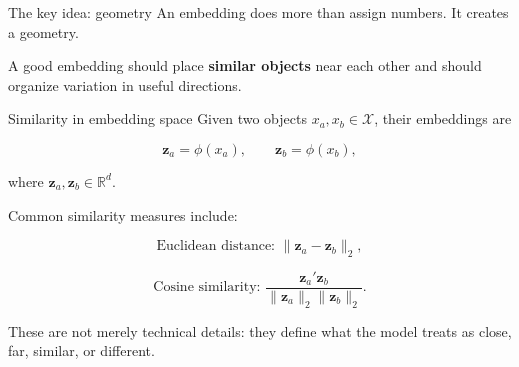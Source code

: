 \documentclass[aspectratio=169]{beamer}
\newcommand{\R}{\mathbb{R}}
\newcommand{\vect}[1]{\boldsymbol{#1}}
\begin{document}
\begin{frame}{The key idea: geometry}
\large
An embedding does more than assign numbers. It creates a geometry.

\vspace{0.3cm}

\begin{center}
\end{center}

\vspace{0.3cm}

A good embedding should place \textbf{similar objects} near each other and should organize variation in useful directions.
\end{frame}

\begin{frame}{Similarity in embedding space}
\large
Given two objects \(x_a,x_b \in \mathcal{X}\), their embeddings are

\[
\vect{z}_a = \phi(x_a), \qquad \vect{z}_b = \phi(x_b),
\]

where \(\vect{z}_a,\vect{z}_b \in \R^d\).

\vspace{0.3cm}

Common similarity measures include:

\[
\text{Euclidean distance: } \|\vect{z}_a-\vect{z}_b\|_2,
\]

\[
\text{Cosine similarity: }
\frac{\vect{z}_a'\vect{z}_b}{\|\vect{z}_a\|_2\|\vect{z}_b\|_2}.
\]

\vspace{0.2cm}

These are not merely technical details: they define what the model treats as close, far, similar, or different.
\end{frame}
\end{document}
